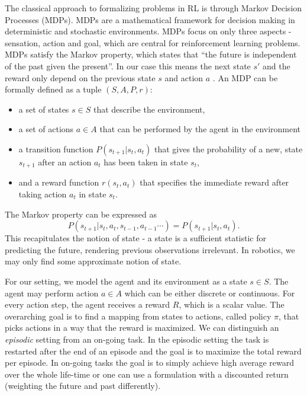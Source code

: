 The classical approach to formalizing problems in RL is through
Markov Decision Processes (MDPs).
MDPs are a mathematical
framework for decision making in deterministic and stochastic environments.
MDPs focus on only three aspects
- sensation, action and goal, which are central
for reinforcement learning problems.
MDPs satisfy the Markov property, which
states that ``the future is independent
of the past given the present''. In our case this means
the next state $s'$ and the reward
only depend on the previous state $s$ and
action $a$ \citep{sutton1992reinforcement}.
An MDP can be formally defined as a tuple $(S, A, P, r)$:

\begin{itemize}
\item a set of states $s \in S$ that describe the environment,
\item a set of actions $a \in A$ that can be performed by the agent in
  the environment
\item a transition function $P(s_{t+1} | s_t, a_t)$ that
  gives the probability of a new,
  state $s_{t+1}$ after an action $a_t$ has been taken in state $s_t$,
\item and a reward function $r(s_t, a_t)$ that specifies
  the immediate reward after taking action
  $a_t$ in state $s_t$.
\end{itemize}

The Markov property can be expressed as
$$ P(s_{t+1} | s_t, a_t, s_{t-1}, a_{t-1}\cdots) = P(s_{t+1} | s_t, a_t). $$
This recapitulates the notion of state - a state is a sufficient statistic
for predicting the future, rendering previous observations irrelevant.
In robotics, we may only find some approximate notion of state.

For our setting, we model the agent and its environment as a state $s \in S$.
The agent may perform action $ a \in A$ which can be
either discrete or continuous.
For every action step, the agent receives a reward $R$,
which is a scalar value.
The overarching goal is to find a mapping from states to actions,
called policy $\pi$, that picks actions in a way that
the reward is maximized.
We can distinguish an \textit{episodic} setting
from an on-going task.
In the episodic setting
the task is restarted after
the end of an episode and the goal is
to maximize the total reward per episode.
In on-going tasks the goal
is to simply achieve high average reward over
the whole life-time or one can use a formulation
with a discounted return (weighting the
future and past differently).

